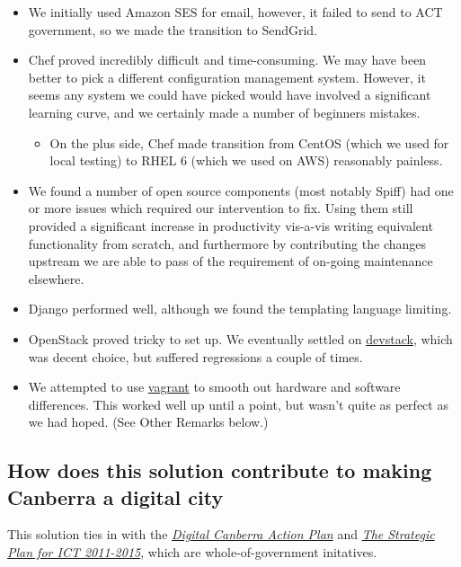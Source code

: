 \documentclass[12pt,a4paper,twosided]{article}
\begin{document}
\begin{itemize}

\item
  We initially used Amazon SES for email, however, it failed to send to
  ACT government, so we made the transition to SendGrid.
\item
  Chef proved incredibly difficult and time-consuming. We may have been
  better to pick a different configuration management system. However,
  it seems any system we could have picked would have involved a
  significant learning curve, and we certainly made a number of
  beginners mistakes.

  \begin{itemize}
  
  \item
    On the plus side, Chef made transition from CentOS (which we used
    for local testing) to RHEL 6 (which we used on AWS) reasonably
    painless.
  \end{itemize}
\item
  We found a number of open source components (most notably Spiff) had
  one or more issues which required our intervention to fix. Using them
  still provided a significant increase in productivity vis-a-vis
  writing equivalent functionality from scratch, and furthermore by
  contributing the changes upstream we are able to pass of the
  requirement of on-going maintenance elsewhere.
\item
  Django performed well, although we found the templating language
  limiting.
\item
  OpenStack proved tricky to set up. We eventually settled on
  \href{http://devstack.org/}{devstack}, which was decent choice, but
  suffered regressions a couple of times.
\item
  We attempted to use \href{http://www.vagrantup.com/}{vagrant} to
  smooth out hardware and software differences. This worked well up
  until a point, but wasn't quite as perfect as we had hoped. (See Other
  Remarks below.)
\end{itemize}

\subsection{How does this solution contribute to making Canberra a
digital city}

This solution ties in with the
\emph{\href{http://www.cmd.act.gov.au/policystrategic/digitalcanberra/actionplan}{Digital
Canberra Action Plan}} and
\emph{\href{http://www.cmd.act.gov.au/__data/assets/pdf_file/0011/247826/The_Strategic_Plan_for_ICT_2011-15.pdf}{The
Strategic Plan for ICT 2011-2015}}, which are whole-of-government
initatives.
\end{document}
